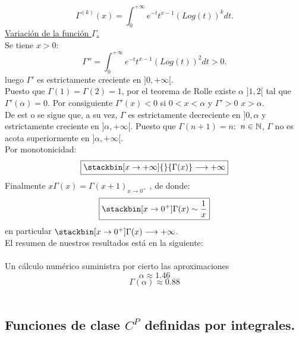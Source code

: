 \begin{equation*}
\boxed{\Gamma^{(k)}(x)=\int_0^{+\infty} e^{-t}t^{x-1}{(Log(t))}^kdt.}
\end{equation*}
\phantom{recorridodobles} \underline{Variación de la función $\Gamma$.}\\
Se tiene \todo $x>0$:\\
$$
\Gamma''=\int_0^{+\infty} e^{-t}t^{x-1}{(Log(t))}^2dt>0.
$$
luego $\Gamma'$ es estrictamente creciente en $]0,+\infty[$. \\
Puesto que $\Gamma(1)=\Gamma(2)=1$, por el teorema de Rolle existe $\alpha$ \en  $]1,2[$ tal que $\Gamma' (\alpha)=0$. Por consiguiente $\Gamma'(x)<0$ si $0<x<\alpha$ y $\Gamma'>0$ \todo \phantom{} $x>\alpha$. \\
De est o se sigue que, a su vez, $\Gamma$ es estrictamente decreciente en $]0,\alpha$ y estrictamente creciente en $]\alpha,+\infty[$. Puesto que  $\Gamma(n+1)=n:$ \todo \phantom{} $n \in \mathbb{N}$, $\Gamma$ no es acota superiormente en $]\alpha,+\infty[$.\\
Por monotonicidad:\\
\begin{equation*}
\boxed{\stackbin[x \to +\infty]{}{\Gamma(x)} \longrightarrow +\infty}
\end{equation*}
Finalmente $x \Gamma(x)={\Gamma(x+1)}_{x \to 0^{+}}$ , de donde:\\
\begin{equation*}
\boxed{\stackbin[x \to 0^{+}]{}{\Gamma(x)} \sim \frac{1}{x}}
\end{equation*}
en particular $\stackbin[x \to 0^{+}]{}{\Gamma(x)} \longrightarrow +\infty$. \\
El resumen de nuestros resultados está en la siguiente: \\ \\

Un cálculo numérico suministra por cierto las aproximaciones \\
$$ 
\alpha \approx 1.46 
$$
$$
\Gamma (\alpha) \approx 0.88
$$
\\
\subsection{Funciones de clase $C^P$ definidas por integrales.}

